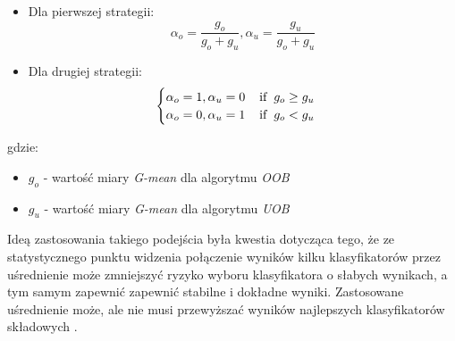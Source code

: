 \begin{itemize}
    \item Dla pierwszej strategii:
    \begin{equation}
        \alpha_o = \frac{g_o}{g_o + g_u}, \alpha_u = \frac{g_u}{g_o + g_u}
    \end{equation}
    \item Dla drugiej strategii:
    \begin{equation}
        \begin{cases}
        \alpha_o = 1, \alpha_u = 0 \hspace{4mm} \textrm{if} \hspace{2mm} g_o \geq g_u\\
        \alpha_o = 0, \alpha_u = 1 \hspace{4mm} \textrm{if} \hspace{2mm} g_o < g_u
        \end{cases}
    \end{equation}
\end{itemize}

\noindent gdzie:

\begin{itemize}
    \item $g_o$ - wartość miary \textit{G-mean} dla algorytmu \textit{OOB}
    \item $g_u$ - wartość miary \textit{G-mean} dla algorytmu \textit{UOB}
\end{itemize}

\noindent Ideą zastosowania takiego podejścia była kwestia dotycząca tego, że ze statystycznego punktu widzenia połączenie wyników kilku klasyfikatorów przez uśrednienie może zmniejszyć ryzyko wyboru klasyfikatora o słabych wynikach, a tym samym zapewnić zapewnić stabilne i dokładne wyniki. Zastosowane uśrednienie może, ale nie musi przewyższać wyników najlepszych klasyfikatorów składowych \cite{Article:Hybrid}\cite{Article:OBSecond}.